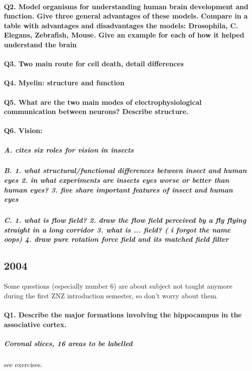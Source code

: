 \documentclass[12pt,article,oneside,a4paper]{memoir}
\begin{document}
\paragraph{Q2. Model organisms for understanding human brain development and function. Give three general advantages of these models. Compare in a table with advantages and disadvantages the models: Drosophila, C. Elegans, Zebrafish, Mouse. Give an example for each of how it helped understand the brain}

\paragraph{Q3. Two main route for cell death, detail differences}

\paragraph{Q4. Myelin: structure and function}

\paragraph{Q5. What are the two main modes of electrophysiological communication between neurons? Describe structure.}

\paragraph{Q6. Vision:}
\subparagraph{A. cites six roles for vision in insects}
\subparagraph{B. 1. what structural/functional differences between insect and human eyes 2. in what experiments are insects eyes worse or better than human eyes? 3. five share important features of insect and human eyes}
\subparagraph{C. 1. what is flow field? 2. draw the flow field perceived by a fly flying straight in a long corridor 3. what is ... field? ( i forgot the name oops) 4. draw pure rotation force field and its matched field filter}


\subsection{2004}
Some questions (especially number 6) are about subject not taught anymore during the first ZNZ introduction semester, so don't worry about them.

\paragraph{Q1. Describe the major formations involving the hippocampus in the associative cortex.}
\subparagraph{Coronal slices, 16 areas to be labelled} see exercises.
\end{document}
